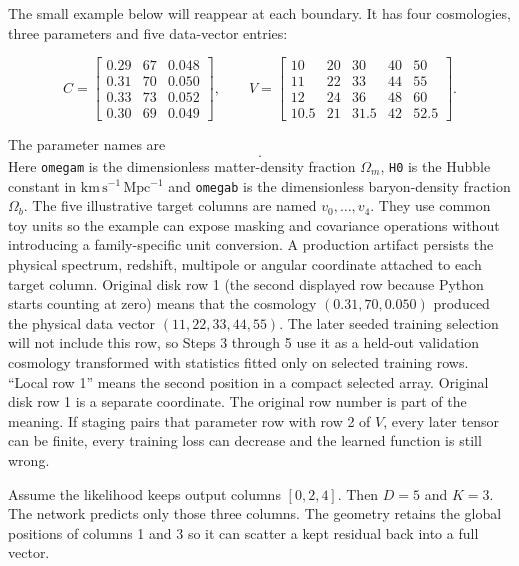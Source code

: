 \documentclass[10pt,aps,prd,twocolumn,nofootinbib]{revtex4-2}
\newcommand{\code}[1]{\texttt{#1}}
\begin{document}
The small example below will reappear at each boundary.  It has four
cosmologies, three parameters and five data-vector entries:
\begin{widetext}
\begin{equation*}
C=\begin{bmatrix}
0.29&67&0.048\\
0.31&70&0.050\\
0.33&73&0.052\\
0.30&69&0.049
\end{bmatrix},\qquad
V=\begin{bmatrix}
10&20&30&40&50\\
11&22&33&44&55\\
12&24&36&48&60\\
10.5&21&31.5&42&52.5
\end{bmatrix}.
\end{equation*}
\end{widetext}
The parameter names are
\begin{equation*}
  [\code{omegam},\code{H0},\code{omegab}].
\end{equation*}
Here \code{omegam} is the dimensionless matter-density fraction
$\Omega_m$, \code{H0} is the Hubble constant in
$\mathrm{km\,s^{-1}\,Mpc^{-1}}$ and \code{omegab} is the dimensionless
baryon-density fraction $\Omega_b$.  The five illustrative target columns are
named $v_0,\ldots,v_4$.  They use common toy units so the example can expose
masking and covariance operations without introducing a family-specific unit
conversion.  A production artifact persists the physical spectrum,
redshift, multipole or angular coordinate attached to each target column.
Original disk row 1 (the second displayed row because Python starts counting
at zero) means that the cosmology $(0.31,70,0.050)$ produced the physical
data vector $(11,22,33,44,55)$.  The later seeded training selection will not
include this row, so Steps 3 through 5 use it as a held-out validation cosmology
transformed with statistics fitted only on selected training rows.  ``Local
row 1'' means the second position in a compact selected array.  Original disk
row 1 is a separate coordinate.  The original row number is
part of the meaning.  If
staging pairs that parameter row with row 2 of $V$, every later tensor can be
finite, every training loss can decrease and the learned function is still
wrong.

Assume the likelihood keeps output columns $[0,2,4]$.  Then $D=5$ and $K=3$.
The network predicts only those three columns.  The geometry retains the
global positions of columns 1 and 3 so it can scatter a kept residual back
into a full vector.
\end{document}
